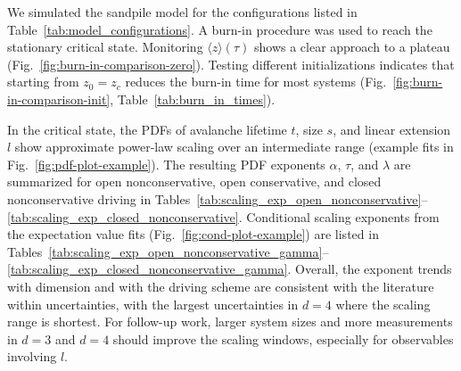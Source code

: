 We simulated the sandpile model for the configurations listed in
Table~\ref{tab:model_configurations}. A burn-in procedure was used to reach
the stationary critical state. Monitoring $\langle z\rangle(\tau)$ shows a
clear approach to a plateau (Fig.~\ref{fig:burn-in-comparison-zero}).
Testing different initializations indicates that starting from $z_0=z_c$
reduces the burn-in time for most systems (Fig.~\ref{fig:burn-in-comparison-init},
Table~\ref{tab:burn_in_times}).

In the critical state, the PDFs of avalanche lifetime $t$, size $s$, and
linear extension $l$ show approximate power-law scaling over an intermediate
range (example fits in Fig.~\ref{fig:pdf-plot-example}). The resulting PDF
exponents $\alpha$, $\tau$, and $\lambda$ are summarized for open
nonconservative, open conservative, and closed nonconservative driving in
Tables~\ref{tab:scaling_exp_open_nonconservative}--\ref{tab:scaling_exp_closed_nonconservative}.
Conditional scaling exponents from the expectation value fits
(Fig.~\ref{fig:cond-plot-example}) are listed in
Tables~\ref{tab:scaling_exp_open_nonconservative_gamma}--\ref{tab:scaling_exp_closed_nonconservative_gamma}.
Overall, the exponent trends with dimension and with the driving scheme are
consistent with the literature within uncertainties, with the largest
uncertainties in $d=4$ where the scaling range is shortest.
For follow-up work, larger system sizes and more measurements in $d=3$ and
$d=4$ should improve the scaling windows, especially for observables
involving $l$.
